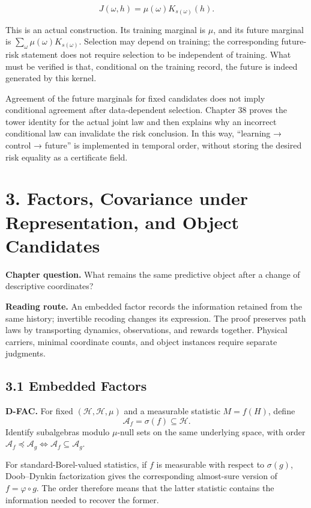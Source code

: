 \documentclass[
  english,
  11pt,
  oneside]{book}
\begin{document}
\[J(\omega,h)=\mu(\omega)K_{s(\omega)}(h).\]

This is an actual construction. Its training marginal is \(\mu\), and its future marginal is \(\sum_\omega\mu(\omega)K_{s(\omega)}\). Selection may depend on training; the corresponding future-risk statement does not require selection to be independent of training. What must be verified is that, conditional on the training record, the future is indeed generated by this kernel.

Agreement of the future marginals for fixed candidates does not imply conditional agreement after data-dependent selection. Chapter 38 proves the tower identity for the actual joint law and then explains why an incorrect conditional law can invalidate the risk conclusion. In this way, ``learning → control → future'' is implemented in temporal order, without storing the desired risk equality as a certificate field.

\chapter{3. Factors, Covariance under Representation, and Object Candidates}\label{ch-3}

\textbf{Chapter question.} What remains the same predictive object after a change of descriptive coordinates?

\textbf{Reading route.} An embedded factor records the information retained from the same history; invertible recoding changes its expression. The proof preserves path laws by transporting dynamics, observations, and rewards together. Physical carriers, minimal coordinate counts, and object instances require separate judgments.

\section{3.1 Embedded Factors}\label{embedded-factors}

\textbf{D-FAC.} For fixed \((\mathcal H,\mathscr H,\mu)\) and a measurable statistic \(M=f(H)\), define \[\mathscr A_f=\sigma(f)\subseteq\mathscr H.\] Identify subalgebras modulo \(\mu\)-null sets on the same underlying space, with order \(\mathscr A_f\preceq\mathscr A_g\iff\mathscr A_f\subseteq\mathscr A_g\).

For standard-Borel-valued statistics, if \(f\) is measurable with respect to \(\sigma(g)\), Doob--Dynkin factorization gives the corresponding almost-sure version of \(f=\varphi\circ g\). The order therefore means that the latter statistic contains the information needed to recover the former.
\end{document}
